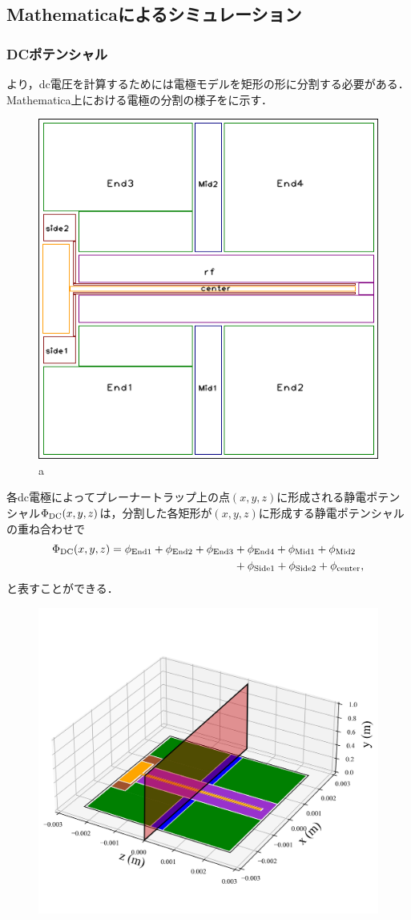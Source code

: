 \subsection{Mathematicaによるシミュレーション}
\subsubsection{DCポテンシャル}
より，dc電圧を計算するためには電極モデルを矩形の形に分割する必要がある．Mathematica上における電極の分割の様子をに示す．
\begin{figure}[h]
	\begin{center}
		\includegraphics[width = 0.4\linewidth]{./theory/figure/named_rect_electrode.png}
	\end{center}
	\caption{a}
	\label{fig:rect_electrode}
\end{figure}
各dc電極によってプレーナートラップ上の点$(x,y,z)$に形成される静電ポテンシャル$\Phi_{\rm DC}(x,y,z)$は，分割した各矩形が$(x,y,z)$に形成する静電ポテンシャルの重ね合わせで
\large
\begin{align}
	\Phi_{\rm DC}(x,y,z) = \phi_{\rm End1} + \phi_{\rm End2} + \phi_{\rm End3} &+ \phi_{\rm End4} + \phi_{\rm Mid1} + \phi_{\rm Mid2} \notag \\
	&+ \phi_{\rm Side1} + \phi_{\rm Side2} + \phi_{\rm center},
\end{align}
\normalsize
と表すことができる．
\begin{figure}[h]
			\begin{center}
				\includegraphics[width = 0.7\linewidth]{./theory/figure/PlannarTrap_3D_z=0.png}
			\end{center}
\end{figure}

